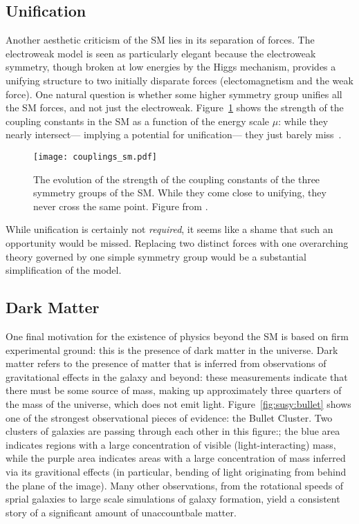 \subsection{Unification}

Another aesthetic criticism of the SM lies in its separation of forces. The electroweak model is seen as particularly elegant because the electroweak symmetry, though broken at low energies by the Higgs mechanism, provides a unifying structure to two initially disparate forces (electomagnetism and the weak force). One natural question is whether some higher symmetry group unifies all the SM forces, and not just the electroweak. Figure~\ref{fig:susy:couplings_sm} shows the strength of the coupling constants in the SM as a function of the energy scale $\mu$: while they nearly intersect--- implying a potential for unification--- they just barely miss~\cite{susypheno}.



\begin{figure}
\centering
\texttt{[image: couplings\_sm.pdf]}
\label{fig:susy:couplings_sm}
\caption{The evolution of the strength of the coupling constants of the three symmetry groups of the SM. While they come close to unifying, they never cross the same point. Figure from \cite{susypheno}.}
\end{figure}


While unification is certainly not \textit{required}, it seems like a shame that such an opportunity would be missed. Replacing two distinct forces with one overarching theory governed by one simple symmetry group would be a substantial simplification of the model.

\subsection{Dark Matter}


One final motivation for the existence of physics beyond the SM is based on firm experimental ground: this is the presence of dark matter in the universe. Dark matter refers to the presence of matter that is inferred from observations of gravitational effects in the galaxy and beyond: these measurements indicate that there must be some source of mass, making up approximately three quarters of the mass of the universe, which does not emit light. Figure~\ref{fig:susy:bullet} shows one of the strongest observational pieces of evidence: the Bullet Cluster. Two clusters of galaxies are passing through each other in this figure:; the blue area indicates regions with a large concentration of visible (light-interacting) mass, while the purple area indicates areas with a large concentration of mass inferred via its gravitional effects (in particular, bending of light originating from behind the plane of the image). Many other observations, from the rotational speeds of sprial galaxies to large scale simulations of galaxy formation, yield a consistent story of a significant amount of unaccountbale matter.


